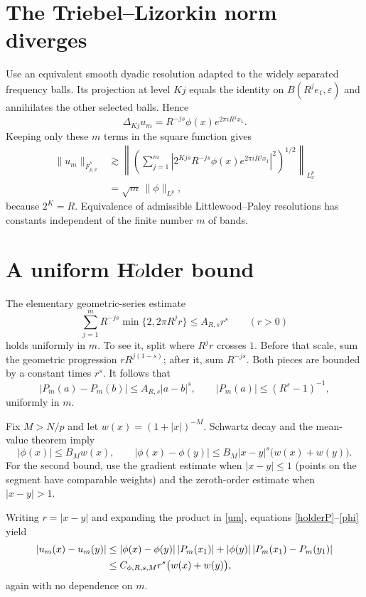 \documentclass[11pt]{article}
\begin{document}
\section*{The Triebel--Lizorkin norm diverges}
Use an equivalent smooth dyadic resolution adapted to the widely separated
frequency balls.  Its projection at level $Kj$ equals the identity on
$B(R^je_1,\varepsilon)$ and annihilates the other selected balls.  Hence
\[
 \Delta_{Kj}u_m=R^{-js}\phi(x)e^{2\pi iR^jx_1}.
\]
Keeping only these $m$ terms in the square function gives
\begin{align*}
 \|u_m\|_{\dot F^s_{p,2}}
 &\gtrsim
 \left\|\left(\sum_{j=1}^m
   \left|2^{Kjs}R^{-js}\phi(x)e^{2\pi iR^jx_1}\right|^2
 \right)^{1/2}\right\|_{L^p_x}\\
 &=\sqrt m\,\|\phi\|_{L^p},
\end{align*}
because $2^K=R$.  Equivalence of admissible Littlewood--Paley resolutions
has constants independent of the finite number $m$ of bands.

\section*{A uniform H\texorpdfstring{$\ddot{o}$}{o}lder bound}
The elementary geometric-series estimate
\begin{equation}\label{geom}
 \sum_{j=1}^m R^{-js}\min\{2,2\pi R^jr\}
 \le A_{R,s}r^s\qquad(r>0)
\end{equation}
holds uniformly in $m$.  To see it, split where $R^jr$ crosses $1$.
Before that scale, sum the geometric progression
$rR^{j(1-s)}$; after it, sum $R^{-js}$.  Both pieces are bounded by a
constant times $r^s$.  It follows that
\begin{equation}\label{holderP}
 |P_m(a)-P_m(b)|\le A_{R,s}|a-b|^s,
 \qquad |P_m(a)|\le (R^s-1)^{-1},
\end{equation}
uniformly in $m$.

Fix $M>N/p$ and let $w(x)=(1+|x|)^{-M}$.  Schwartz decay and the mean-value
theorem imply
\begin{equation}\label{phi}
 |\phi(x)|\le B_Mw(x),\qquad
 |\phi(x)-\phi(y)|
 \le B_M|x-y|^s\bigl(w(x)+w(y)\bigr).
\end{equation}
For the second bound, use the gradient estimate when $|x-y|\le1$ (points
on the segment have comparable weights) and the zeroth-order estimate when
$|x-y|>1$.

Writing $r=|x-y|$ and expanding the product in \eqref{um}, equations
\eqref{holderP}--\eqref{phi} yield
\begin{align}
 |u_m(x)-u_m(y)|
 &\le |\phi(x)-\phi(y)|\,|P_m(x_1)|
      +|\phi(y)|\,|P_m(x_1)-P_m(y_1)|\notag\\
 &\le C_{\phi,R,s,M}r^s\bigl(w(x)+w(y)\bigr),\label{pointwise}
\end{align}
again with no dependence on $m$.
\end{document}
